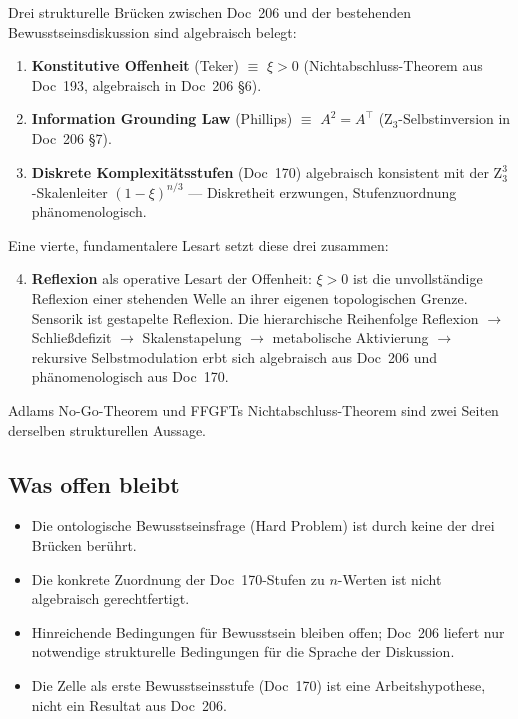 \begin{conclusionBox}
Drei strukturelle Brücken zwischen Doc~206 und der bestehenden Bewusstseinsdiskussion sind algebraisch belegt:

\begin{enumerate}
\item \textbf{Konstitutive Offenheit} (Teker) $\equiv$ $\xi > 0$ (Nichtabschluss-Theorem aus Doc~193, algebraisch in Doc~206 \S6).
\item \textbf{Information Grounding Law} (Phillips) $\equiv$ $A^2 = A^\top$ (Z$_3$-Selbstinversion in Doc~206 \S7).
\item \textbf{Diskrete Komplexitätsstufen} (Doc~170) algebraisch konsistent mit der Z$_3^3$-Skalenleiter $(1-\xi)^{n/3}$ — Diskretheit erzwungen, Stufenzuordnung phänomenologisch.
\end{enumerate}

Eine vierte, fundamentalere Lesart setzt diese drei zusammen:

\begin{enumerate}
\setcounter{enumi}{3}
\item \textbf{Reflexion} als operative Lesart der Offenheit: $\xi > 0$ ist die unvollständige Reflexion einer stehenden Welle an ihrer eigenen topologischen Grenze. Sensorik ist gestapelte Reflexion. Die hierarchische Reihenfolge Reflexion $\to$ Schließdefizit $\to$ Skalenstapelung $\to$ metabolische Aktivierung $\to$ rekursive Selbstmodulation erbt sich algebraisch aus Doc~206 und phänomenologisch aus Doc~170.
\end{enumerate}

Adlams No-Go-Theorem und FFGFTs Nichtabschluss-Theorem sind zwei Seiten derselben strukturellen Aussage.
\end{conclusionBox}

\subsection{Was offen bleibt}

\begin{itemize}
\item Die ontologische Bewusstseinsfrage (\glqq Hard Problem\grqq{}) ist durch keine der drei Brücken berührt.
\item Die konkrete Zuordnung der Doc~170-Stufen zu $n$-Werten ist nicht algebraisch gerechtfertigt.
\item Hinreichende Bedingungen für Bewusstsein bleiben offen; Doc~206 liefert nur notwendige strukturelle Bedingungen für die Sprache der Diskussion.
\item Die Zelle als \glqq erste Bewusstseinsstufe\grqq{} (Doc~170) ist eine Arbeitshypothese, nicht ein Resultat aus Doc~206.
\end{itemize}

